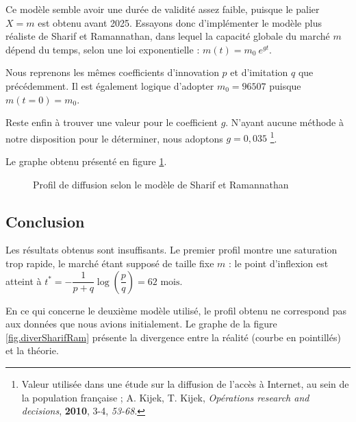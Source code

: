 \documentclass[10pt]{article}
\begin{document}
		Ce modèle semble avoir une durée de validité assez faible, puisque le palier $X = m$ est obtenu avant 2025. Essayons donc d'implémenter le modèle plus réaliste de Sharif et Ramannathan, dans lequel la capacité globale du marché $m$ dépend du temps, selon une loi exponentielle : $m(t) = m_0\ e^{gt}$.
		
		Nous reprenons les mêmes coefficients d'innovation $p$ et d'imitation $q$ que précédemment. Il est également logique d'adopter $m_0 = 96507$ puisque $m(t = 0) = m_0$.
		
		Reste enfin à trouver une valeur pour le coefficient $g$. N'ayant aucune méthode à notre disposition pour le déterminer, nous adoptons $g = 0,035$ \footnote{Valeur utilisée dans une étude sur la diffusion de l'accès à Internet, au sein de la population française ; A. Kijek, T. Kijek, \textit{Opérations research and decisions}, \textbf{2010}, 3-4, \textit{53-68}.}.
		
		Le graphe obtenu présenté en figure \ref{fig.SharifRaman}.
		
		\begin{figure}[h!]
			\caption{Profil de diffusion selon le modèle de Sharif et Ramannathan \label{fig.SharifRaman}}
			\begin{center}
			\end{center}
		\end{figure}
		
	\subsection{Conclusion}
		
		Les résultats obtenus sont insuffisants. Le premier profil montre une saturation trop rapide, le marché étant supposé de taille fixe $m$ : le point d'inflexion est atteint à $t^* = -\dfrac{1}{p+q} \log{\left(\dfrac{p}{q}\right)} = 62 \text{ mois}$.
		
		En ce qui concerne le deuxième modèle utilisé, le profil obtenu ne correspond pas aux données que nous avions initialement. Le graphe de la figure \ref{fig.diverSharifRam} présente la divergence entre la réalité (courbe en pointillés) et la théorie.
		
\end{document}
